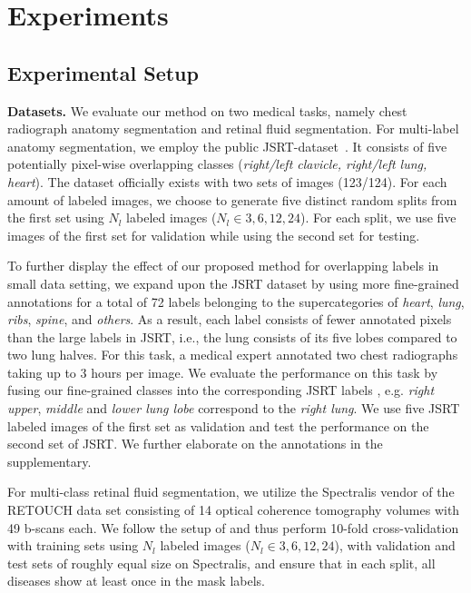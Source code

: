 \documentclass[letterpaper]{article} %
\begin{document}
\section{Experiments}
\subsection{Experimental Setup}
\noindent\textbf{Datasets.}  We evaluate our method on two medical tasks, namely chest radiograph anatomy segmentation and retinal fluid segmentation. For multi-label anatomy segmentation, we employ the public JSRT-dataset~\cite{jsrt}. It consists of five potentially pixel-wise overlapping classes (\textit{right/left clavicle, right/left lung, heart}). The dataset officially exists with two sets of images (123/124). For each amount of labeled images, we choose to generate five distinct random splits from the first set using $N_l$ labeled images ($N_l\in{3,6,12,24}$). 
For each split, we use five images of the first set for validation while using the second set for testing.

To further display the effect of our proposed method for overlapping labels in small data setting, we expand upon the JSRT dataset by using more fine-grained annotations for a total of 72 labels belonging to the supercategories of \textit{heart}, \textit{lung}, \textit{ribs}, \textit{spine}, and \textit{others}. As a result, each label consists of fewer annotated pixels than the large labels in JSRT, i.e., the lung consists of its five lobes compared to two lung halves.
For this task, a medical expert annotated two chest radiographs taking up to 3 hours per image. 
We evaluate the performance on this task by fusing our fine-grained classes into the corresponding JSRT labels , e.g. \textit{right upper}, \textit{middle} and \textit{lower lung lobe} correspond to the \textit{right lung}. We use five JSRT labeled images of the first set as validation and test the performance on the second set of JSRT. We further elaborate on the annotations in the supplementary.

For multi-class retinal fluid segmentation, we utilize the Spectralis vendor of the RETOUCH data set consisting of 14 optical coherence tomography volumes with 49 b-scans each. We follow the setup of \cite{reiss2021every} and thus perform 10-fold cross-validation with training sets using $N_l$ labeled images ($N_l\in{3,6,12,24}$), with validation and test sets of roughly equal size on Spectralis, and ensure that in each split, all diseases show at least once in the mask labels.
\end{document}

